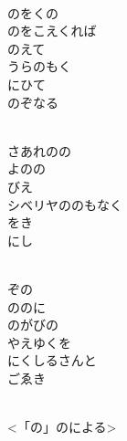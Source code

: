 \documentclass[10pt,b5j]{tarticle} %
\begin{document}
\vspace{1.5em} %
\newcommand{\linespace}{0.5em} %
\newcommand{\blocksize}{0.5\hsize} %
\newcommand{\itemmargin}{6em} %
\begin{enumerate} %
    \setlength{\itemindent}{\itemmargin} %
    \begin{minipage}[c]{\blocksize}
    
        \vspace{\linespace}
        \item~\\
        のをくの\\
        のをこえくれば\\
        のえて\\
        うらのもく\\
        にひて\\
        のぞなる
        
        \vspace{\linespace}
        \item~\\
        さあれのの\\
        よのの\\
        びえ\\
        シベリヤののもなく\\
        をき\\
        にし
        
        \vspace{\linespace}
        \item~\\
        ぞの\\
        ののに\\
        のがびの\\
        やえゆくを\\
        にくしるさんと\\
        ごゑき
        
        \vspace{\linespace}
        \item~\\
        <「の」のによる>
    
    \end{minipage}
\end{enumerate} %
\end{document}
